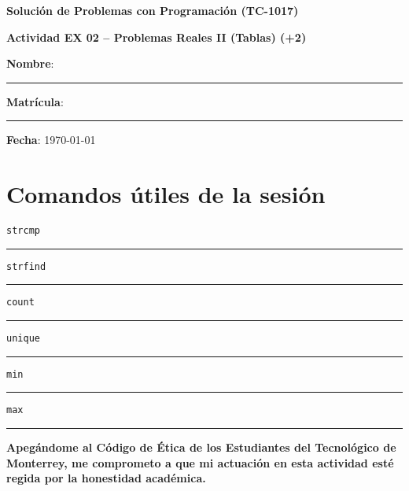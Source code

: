 \documentclass[spanish, 10pt]{article}
\newcommand{\responserule}{{\large\rule{14 cm}{0.3mm}}}
\newcommand{\matlab}[1]{\lstinline[style=Matlab-pyglike]!#1!}
\begin{document}
\begin{center}
	{\Large \textbf{Solución de Problemas con Programación (TC-1017)}}
	
	\bigskip
	{\large \textbf{Actividad EX 02 -- Problemas Reales II (Tablas) (+2)}}
\end{center}

\bigskip
{\large \textbf{Nombre}: \rule{13.7 cm}{0.4mm}}



\bigskip
{\large \textbf{Matrícula}: \rule{5 cm}{0.4mm}} \hfill {\large \textbf{Fecha}: \today}

\bigskip


\section*{Comandos útiles de la sesión}

\matlab{strcmp} \hfill \\[1.5ex]
\responserule

\bigskip

\matlab{strfind} \hfill \\[1.5ex]
\responserule

\bigskip

\matlab{count} \hfill \\[1.5ex]
\responserule

\bigskip

\matlab{unique} \hfill \\[1.5ex]
\responserule

\bigskip

\matlab{min} \hfill \\[1.5ex]
\responserule

\bigskip

\matlab{max} \hfill \\[1.5ex]
\responserule

\vfill

\textbf{Apegándome al Código de Ética de los Estudiantes del Tecnológico de Monterrey, me comprometo a que mi actuación en esta actividad esté regida por la honestidad académica.}
\end{document}
